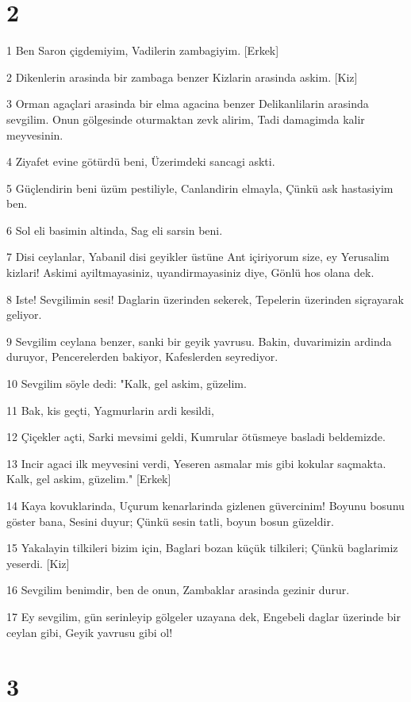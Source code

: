 \chapter{2}

\par 1 Ben Saron çigdemiyim, Vadilerin zambagiyim. [Erkek]
\par 2 Dikenlerin arasinda bir zambaga benzer Kizlarin arasinda askim. [Kiz]
\par 3 Orman agaçlari arasinda bir elma agacina benzer Delikanlilarin arasinda sevgilim. Onun gölgesinde oturmaktan zevk alirim, Tadi damagimda kalir meyvesinin.
\par 4 Ziyafet evine götürdü beni, Üzerimdeki sancagi askti.
\par 5 Güçlendirin beni üzüm pestiliyle, Canlandirin elmayla, Çünkü ask hastasiyim ben.
\par 6 Sol eli basimin altinda, Sag eli sarsin beni.
\par 7 Disi ceylanlar, Yabanil disi geyikler üstüne Ant içiriyorum size, ey Yerusalim kizlari! Askimi ayiltmayasiniz, uyandirmayasiniz diye, Gönlü hos olana dek.
\par 8 Iste! Sevgilimin sesi! Daglarin üzerinden sekerek, Tepelerin üzerinden siçrayarak geliyor.
\par 9 Sevgilim ceylana benzer, sanki bir geyik yavrusu. Bakin, duvarimizin ardinda duruyor, Pencerelerden bakiyor, Kafeslerden seyrediyor.
\par 10 Sevgilim söyle dedi: "Kalk, gel askim, güzelim.
\par 11 Bak, kis geçti, Yagmurlarin ardi kesildi,
\par 12 Çiçekler açti, Sarki mevsimi geldi, Kumrular ötüsmeye basladi beldemizde.
\par 13 Incir agaci ilk meyvesini verdi, Yeseren asmalar mis gibi kokular saçmakta. Kalk, gel askim, güzelim." [Erkek]
\par 14 Kaya kovuklarinda, Uçurum kenarlarinda gizlenen güvercinim! Boyunu bosunu göster bana, Sesini duyur; Çünkü sesin tatli, boyun bosun güzeldir.
\par 15 Yakalayin tilkileri bizim için, Baglari bozan küçük tilkileri; Çünkü baglarimiz yeserdi. [Kiz]
\par 16 Sevgilim benimdir, ben de onun, Zambaklar arasinda gezinir durur.
\par 17 Ey sevgilim, gün serinleyip gölgeler uzayana dek, Engebeli daglar üzerinde bir ceylan gibi, Geyik yavrusu gibi ol!

\chapter{3}

